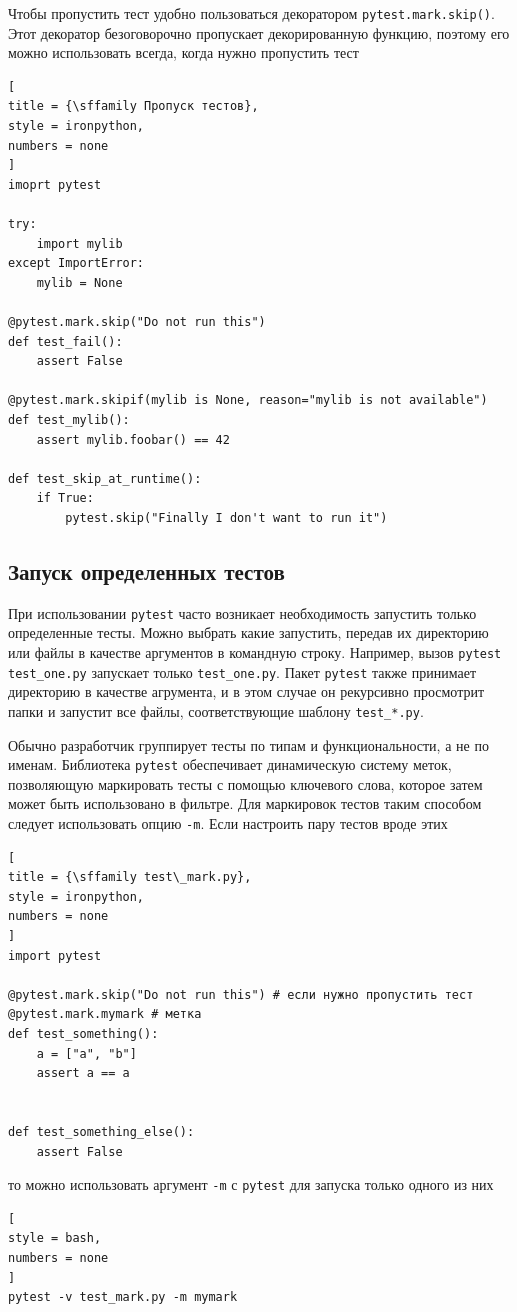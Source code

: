 \documentclass[%
	11pt,
	a4paper,
	utf8,
		]{article}
\begin{document}
Чтобы пропустить тест удобно пользоваться декоратором \texttt{pytest.mark.skip()}. Этот декоратор безоговорочно пропускает декорированную функцию, поэтому его можно использовать всегда, когда нужно пропустить тест
\begin{lstlisting}[
title = {\sffamily Пропуск тестов},
style = ironpython,
numbers = none	
]
imoprt pytest

try:
    import mylib
except ImportError:
    mylib = None
    
@pytest.mark.skip("Do not run this")
def test_fail():
    assert False
    
@pytest.mark.skipif(mylib is None, reason="mylib is not available")
def test_mylib():
    assert mylib.foobar() == 42
    
def test_skip_at_runtime():
    if True:
        pytest.skip("Finally I don't want to run it")
\end{lstlisting}

\subsection{Запуск определенных тестов}

При использовании \texttt{pytest} часто возникает необходимость запустить только определенные тесты. Можно выбрать какие запустить, передав их директорию или файлы в качестве аргументов в командную строку. Например, вызов \texttt{pytest test\_one.py} запускает только \texttt{test\_one.py}. Пакет \texttt{pytest} также принимает директорию в качестве агрумента, и в этом случае он рекурсивно просмотрит папки и запустит все файлы, соответствующие шаблону \texttt{test\_*.py}.

Обычно разработчик группирует тесты по типам и функциональности, а не по именам. Библиотека \texttt{pytest} обеспечивает динамическую систему меток, позволяющую маркировать тесты с помощью ключевого слова, которое затем может быть использовано в фильтре. Для маркировок тестов таким способом следует использовать опцию \verb|-m|. Если настроить пару тестов вроде этих
\begin{lstlisting}[
title = {\sffamily test\_mark.py},
style = ironpython,
numbers = none	
]
import pytest

@pytest.mark.skip("Do not run this") # если нужно пропустить тест
@pytest.mark.mymark # метка
def test_something():
    a = ["a", "b"]
    assert a == a
    

def test_something_else():
    assert False
\end{lstlisting}
то можно использовать аргумент \verb|-m| с \texttt{pytest} для запуска только одного из них
\begin{lstlisting}[
style = bash,
numbers = none	
]
pytest -v test_mark.py -m mymark
\end{lstlisting}
\end{document}
